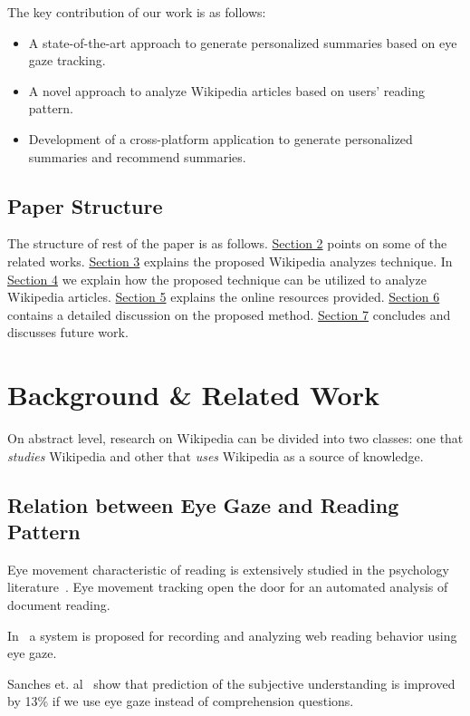\documentclass[12pt]{article}
\begin{document}
The key contribution of our work is as follows:
\begin{itemize}
	\item A state-of-the-art approach to generate personalized summaries based on eye gaze tracking.
	\item A novel approach to analyze Wikipedia articles based on users' reading pattern.
	\item Development of a cross-platform application to generate personalized summaries and recommend summaries.	
\end{itemize}



\subsection{Paper Structure}
The structure of rest of the paper is as follows. \hyperref[sec:Related]{Section 2} points on some of the related works. \hyperref[sec:Proposed]{Section 3} explains the proposed Wikipedia analyzes technique. In \hyperref[sec:Analysis]{Section 4} we explain how the proposed technique can be utilized to analyze Wikipedia articles. \hyperref[sec:Resources]{Section 5} explains the online resources provided. \hyperref[sec:Discussion]{Section 6} contains a detailed discussion on the proposed method. \hyperref[sec:Conclusion]{Section 7} concludes and discusses future work.


\section{Background \& Related Work}\label{sec:Related}

On abstract level, research on Wikipedia can be divided into two classes: one that \emph{studies} Wikipedia and other that \emph{uses} Wikipedia as a source of knowledge.


\subsection{Relation between Eye Gaze and Reading Pattern}
Eye movement characteristic of reading is extensively studied in the psychology literature~\cite{rayner1998eye}. Eye movement tracking open the door for an automated analysis of document reading. 

In~\cite{beymer2005webgazeanalyzer} a system is proposed for recording and analyzing web reading behavior using eye gaze.

Sanches et. al~\cite{sanches2018estimation} show that prediction of the subjective understanding is improved by 13\% if we use eye gaze instead of comprehension questions.
\end{document}

